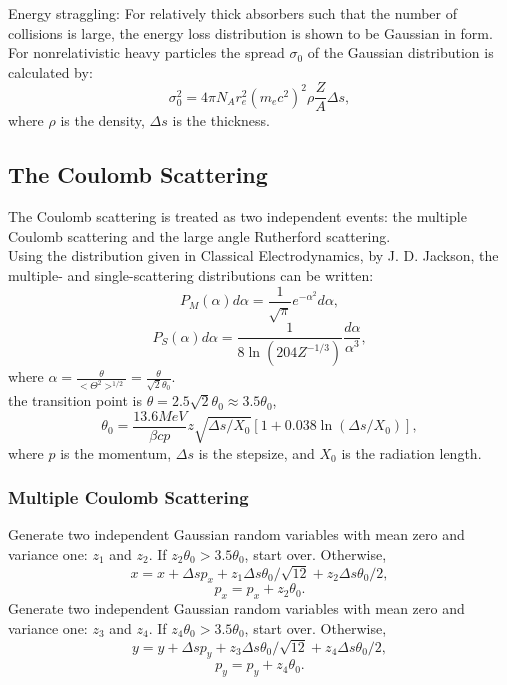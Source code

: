 \documentclass{article}
\begin{document}
Energy straggling: For relatively thick absorbers such that the number of collisions is large, the energy loss distribution is shown to be Gaussian in form.
For nonrelativistic heavy particles the spread $\sigma_0$ of the Gaussian distribution is calculated by:
\begin{equation}
\sigma_0^2=4\pi N_Ar_e^2(m_ec^2)^2\rho\frac{Z}{A}\Delta s,
\end{equation}
where $\rho$ is the density, $\Delta s$ is the thickness.


\subsection{The Coulomb Scattering}
The Coulomb scattering is treated as two independent events: the multiple Coulomb scattering and the large angle Rutherford scattering.\\
Using the distribution given in Classical Electrodynamics, by J. D. Jackson, the multiple- and single-scattering distributions can be written:
\begin{equation}
\label{eq:PM}
P_M(\alpha) d \alpha=\frac{1}{\sqrt{\pi}}e^{-\alpha^2}d\alpha,
\end{equation}
\begin{equation}
\label{eq:Ps}
P_S(\alpha) d \alpha=\frac{1}{8 \ln(204 Z^{-1/3})} \frac{d \alpha}{\alpha^3},
\end{equation}
where $\alpha=\frac{\theta}{<\Theta^2>^{1/2}}=\frac{\theta}{\sqrt 2 \theta_0}$.\\

 the transition point is $\theta=2.5 \sqrt 2 \theta_0\approx3.5 \theta_0$,
\begin{equation}
\label{eq:Multiple}
\theta_0=\frac{13.6MeV}{\beta c p} z \sqrt{\Delta s/X_0} [1+0.038 \ln(\Delta s/X_0)],
\end{equation}
where $p$ is the momentum, $\Delta s$ is the stepsize, and $X_0$ is the radiation length. 

\subsubsection{Multiple Coulomb Scattering}
Generate two independent Gaussian random variables  with mean zero and variance one: $z_1$ and $z_2$.
If $z_2 \theta_0>3.5 \theta_0$, start over. Otherwise,
\begin{equation}
\label{eq:Multiplex}
x=x+\Delta s p_x+z_1 \Delta s \theta_0/\sqrt{12}+z_2 \Delta s \theta_0/2,
\end{equation}
\begin{equation}
\label{eq:Multiplepx}
p_x=p_x+z_2 \theta_0.
\end{equation}
Generate two independent Gaussian random variables  with mean zero and variance one: $z_3$ and $z_4$.
If $z_4 \theta_0>3.5 \theta_0$, start over. Otherwise,
\begin{equation}
\label{eq:Multipley}
y=y+\Delta s p_y+z_3 \Delta s \theta_0/\sqrt{12}+z_4 \Delta s \theta_0/2,
\end{equation}
\begin{equation}
\label{eq:Multiplepy}
p_y=p_y+z_4 \theta_0.
\end{equation}
\end{document}
